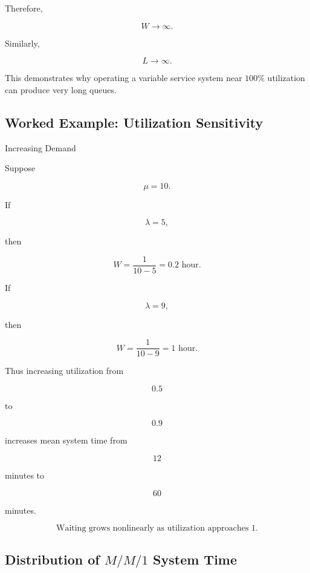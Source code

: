 Therefore,

\[
\boxed{
W\to\infty.
}
\]

Similarly,

\[
\boxed{
L\to\infty.
}
\]

This demonstrates why operating a variable service system near \(100\%\)
utilization can produce very long queues.

\subsection{Worked Example: Utilization Sensitivity}
\label{subsec:worked-utilization-sensitivity}

\begin{workedexamplebox}{Increasing Demand}

Suppose

\[
\mu=10.
\]

If

\[
\lambda=5,
\]

then

\[
W
=
\frac1{10-5}
=
0.2
\text{ hour}.
\]

If

\[
\lambda=9,
\]

then

\[
W
=
\frac1{10-9}
=
1
\text{ hour}.
\]

Thus increasing utilization from

\[
0.5
\]

to

\[
0.9
\]

increases mean system time from

\[
12
\]

minutes to

\[
60
\]

minutes.

\begin{answerbox}
\[
\boxed{
\text{Waiting grows nonlinearly as utilization approaches }1.
}
\]
\end{answerbox}

\end{workedexamplebox}

\subsection{Distribution of \(M/M/1\) System Time}
\label{subsec:mm1-system-time-distribution}

